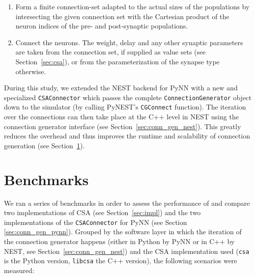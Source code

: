 \documentclass{frontiersSCNS} %
\begin{document}
\begin{enumerate}
\item Form a finite connection-set adapted to the actual sizes of the
  populations by intersecting the given connection set with the
  Cartesian product of the neuron indices of the pre- and
  post-synaptic populations.
\item Connect the neurons. The weight, delay and any other synaptic
  parameters are taken from the connection set, if supplied as value
  sets (see Section~\ref{sec:csa}), or from the parameterization of
  the synapse type otherwise.
\end{enumerate}

During this study, we extended the NEST backend for PyNN with a new
and specialized \verb|CSAConnector| which passes the complete
\verb|ConnectionGenerator| object down to the simulator (by calling
PyNEST's \verb|CGConnect| function). The iteration over the
connections can then take place at the C++ level in NEST using the
connection generator interface (see
Section~\ref{sec:conn_gen_nest}). This greatly reduces the overhead
and thus improves the runtime and scalability of connection generation
(see Section~\ref{sec:benchmarks}).


\section{Benchmarks}\label{sec:benchmarks}

We ran a series of benchmarks in order to assess the performance of
and compare two implementations of CSA (see Section~\ref{sec:impl})
and the two implementations of the \verb|CSAConnector| for PyNN (see
Section \ref{sec:conn_gen_pynn}). Grouped by the software layer in
which the iteration of the connection generator happens (either in
Python by PyNN or in C++ by NEST, see Section~\ref{sec:conn_gen_nest})
and the CSA implementation used (\verb|csa| is the Python version,
\verb|libcsa| the C++ version), the following scenarios were measured:
\end{document}
